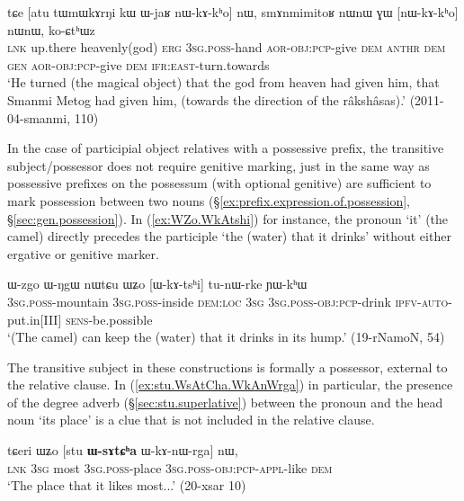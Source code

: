 \begin{exe}
\ex \label{ex:GW.kW.nWkAkho}
 \gll tɕe [atu tɯmɯkɤrŋi kɯ ɯ-jaʁ nɯ-kɤ-kʰo] nɯ, smɤnmimitoʁ nɯnɯ ɣɯ [nɯ-kɤ-kʰo] nɯnɯ, ko-ɕtʰɯz\\
\textsc{lnk} up.there heavenly(god) \textsc{erg} \textsc{3sg}.\textsc{poss}-hand \textsc{aor}-\textsc{obj}:\textsc{pcp}-give \textsc{dem}  \textsc{anthr} \textsc{dem} \textsc{gen} \textsc{aor}-\textsc{obj}:\textsc{pcp}-give \textsc{dem} \textsc{ifr}:\textsc{east}-turn.towards\\
\glt `He turned (the magical object) that the god from heaven had given him, that Smanmi Metog had given him, (towards the direction of the râkshâsas).' (2011-04-smanmi, 110)
\end{exe}

In the case of participial object relatives with a possessive prefix, the transitive subject/possessor does not require genitive marking, just in the same way as possessive prefixes on the possessum (with optional genitive) are sufficient to mark possession between two nouns (§\ref{ex:prefix.expression.of.possession}, §\ref{sec:gen.possession}). In (\ref{ex:WZo.WkAtshi}) for instance, the pronoun  `it' (the camel) directly precedes the participle  `the (water) that it drinks' without either ergative or genitive marker.

\begin{exe}
\ex \label{ex:WZo.WkAtshi}
 \gll ɯ-zgo ɯ-ŋgɯ nɯtɕu ɯʑo [ɯ-kɤ-tsʰi] tu-nɯ-rke ɲɯ-kʰɯ \\
\textsc{3sg}.\textsc{poss}-mountain \textsc{3sg}.\textsc{poss}-inside \textsc{dem}:\textsc{loc} \textsc{3sg} \textsc{3sg}.\textsc{poss}-\textsc{obj}:\textsc{pcp}-drink \textsc{ipfv}-\textsc{auto}-put.in[III] \textsc{sens}-be.possible \\
\glt `(The camel) can keep the (water) that it drinks in its hump.' (19-rNamoN, 54)
\end{exe}

The transitive subject in these constructions is formally a possessor, external to the relative clause. In (\ref{ex:stu.WsAtCha.WkAnWrga}) in particular, the presence of the degree adverb  (§\ref{sec:stu.superlative}) between the pronoun  and the head noun  `its place' is a clue that  is not included in the relative clause.

\begin{exe}
\ex \label{ex:stu.WsAtCha.WkAnWrga}
\gll  tɕeri ɯʑo [stu \textbf{ɯ-sɤtɕʰa} ɯ-kɤ-nɯ-rga] nɯ, \\
\textsc{lnk} \textsc{3sg} most \textsc{3sg}.\textsc{poss}-place \textsc{3sg}.\textsc{poss}-\textsc{obj}:\textsc{pcp}-\textsc{appl}-like \textsc{dem} \\
\glt `The place that it likes most...' (20-xsar 10)
\end{exe}

